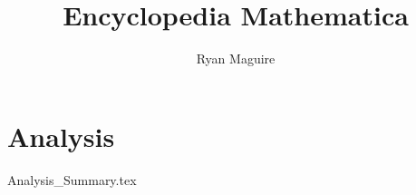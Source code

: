 \documentclass[crop=false,class=book,oneside]{standalone}
\begin{document}
    \newif\ifcourses
    \ifx\ifmain\undefined
        \title{Encyclopedia Mathematica}
        \author{Ryan Maguire}
        \date{\vspace{-5ex}}
        \maketitle
        \tableofcontents
        \listoffigures
        \listoftables
        \clearpage
    \fi
    \part{Analysis}
        {Analysis_Summary.tex}
\end{document}
